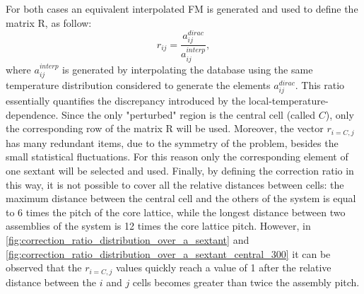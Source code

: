 \documentclass[letterpaper]{physor2026}
\begin{document}

For both cases an equivalent interpolated FM is generated and used to define the matrix R, as follow: 
\begin{equation}\label{eq:linear_interpolation}
     r_{ij}= \frac{a_{ij}^{dirac}}{a_{ij}^{interp}}, 
\end{equation}
where $a_{ij}^{interp}$ is generated by interpolating the database using the same temperature distribution considered to generate the elements $a_{ij}^{dirac}$. This ratio essentially quantifies the discrepancy introduced by the local-temperature-dependence.
Since the only "perturbed" region is the central cell (called $C$), only the corresponding row of the matrix R will be used. Moreover, the vector $r_{i=C,j}$ has many redundant items, due to the symmetry of the problem, besides the small statistical fluctuations. For this reason only the corresponding element of one sextant will be selected and used.
Finally, by defining the correction ratio in this way, it is not possible to cover all the relative distances between cells: the maximum distance between the central cell and the others of the system is equal to 6 times the pitch of the core lattice, while the longest distance between two assemblies of the system is 12 times the core lattice pitch. However, in \cref{fig:correction_ratio_distribution_over_a_sextant} and \cref{fig:correction_ratio_distribution_over_a_sextant_central_300} it can be observed that the $r_{i=C,j}$ values quickly reach a value of 1 after the relative distance between the $i$ and $j$ cells becomes greater than twice the assembly pitch.  


\end{document}
